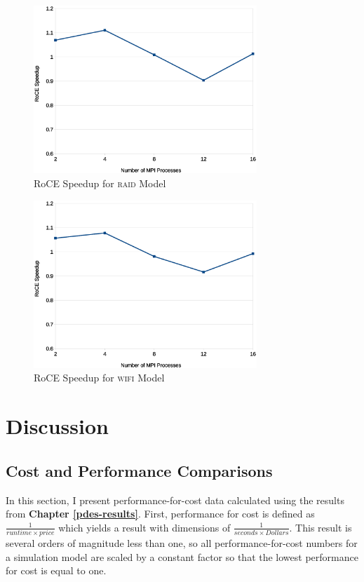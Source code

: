 \documentclass[11pt]{book}
\begin{document}
\begin{figure}
\centering
\includegraphics[width=0.75\textwidth]{raid_speedup}
\caption{RoCE Speedup for \textsc{raid} Model}
\label{raid-speedup}
\end{figure}

\begin{figure}
\centering
\includegraphics[width=0.75\textwidth]{wifi_speedup}
\caption{RoCE Speedup for \textsc{wifi} Model}
\label{wifi-speedup}
\end{figure}


\newpage
\chapter{Discussion}
\label{conclusions}

\section{\textbf{Cost and Performance Comparisons}}

In this section, I present performance-for-cost data calculated using the
results from \textbf{Chapter \ref{pdes-results}}. First, performance for cost is
defined as $\frac{1}{runtime \times price}$ which yields a result with
dimensions of $\frac{1}{seconds \times Dollars}$. This result is several orders
of magnitude less than one, so all performance-for-cost numbers for a simulation
model are scaled by a constant factor so that the lowest performance for cost is
equal to one.
\end{document}
